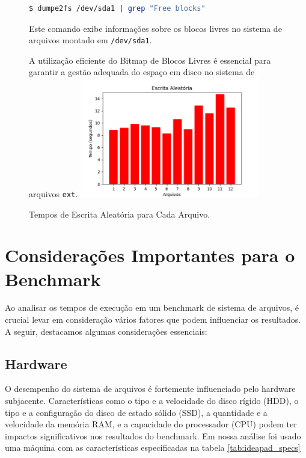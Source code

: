 \documentclass[
	12pt,				%
	openright,			%
	oneside,			%
	a4paper,			%
	chapter=TITLE,		%
	english,			%
	french,				%
	spanish,			%
	brazil				%
	]{abntex2}
\theoremstyle{definition}
\begin{document}
\begin{figure}[H]
	\begin{lstlisting}[language=bash, caption={Exemplo de Manipulação do Bitmap de Blocos Livres}]
	$ dumpe2fs /dev/sda1 | grep "Free blocks"
	\end{lstlisting}
	
	Este comando exibe informações sobre os blocos livres no sistema de arquivos montado em \texttt{/dev/sda1}.
	
	A utilização eficiente do Bitmap de Blocos Livres é essencial para garantir a gestão adequada do espaço em disco no sistema de arquivos \texttt{ext}.
    \includegraphics[width=0.7\textwidth]{RandomWrite.png}
    \caption{Tempos de Escrita Aleatória para Cada Arquivo.}
    \label{fig:rw}
\end{figure}

\section{Considerações Importantes para o Benchmark}

Ao analisar os tempos de execução em um benchmark de sistema de arquivos, é crucial levar em 
consideração vários fatores que podem influenciar os resultados. A seguir, destacamos
algumas considerações essenciais:

\subsection{Hardware}

O desempenho do sistema de arquivos é fortemente influenciado pelo hardware 
subjacente. Características como o tipo e a velocidade do disco rígido (HDD), 
o tipo e a configuração do disco de estado sólido (SSD), a quantidade e a 
velocidade da memória RAM, e a capacidade do processador (CPU) podem ter 
impactos significativos nos resultados do benchmark. Em nossa análise foi usado
uma máquina com as características especificadas na tabela \ref{tab:ideapad_specs}
\end{document}
